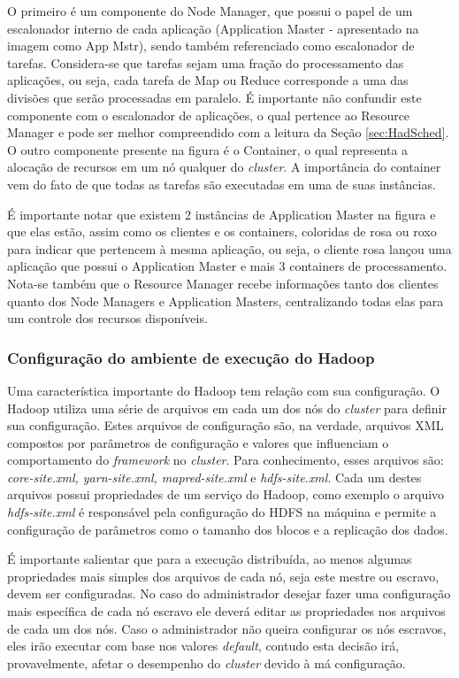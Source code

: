 O primeiro é um componente do Node Manager, que possui o papel de um escalonador interno de cada aplicação (Application Master - apresentado na imagem como App Mstr), sendo também referenciado como escalonador de tarefas. Considera-se que tarefas sejam uma fração do processamento das aplicações, ou seja, cada tarefa de Map ou Reduce corresponde a uma das divisões que serão processadas em paralelo. É importante não confundir este componente com o escalonador de aplicações, o qual pertence ao Resource Manager e pode ser melhor compreendido com a leitura da Seção \ref{sec:HadSched}. O outro componente presente na figura é o Container, o qual representa a alocação de recursos em um nó qualquer do \textit{cluster}. A importância do container vem do fato de que todas as tarefas são executadas em uma de suas instâncias.

É importante notar que existem 2 instâncias de Application Master na figura e que elas estão, assim como os clientes e os containers, coloridas de rosa ou roxo para indicar que pertencem à mesma aplicação, ou seja, o cliente rosa lançou uma aplicação que possui o Application Master e mais 3 containers de processamento. Nota-se também que o Resource Manager recebe informações tanto dos clientes quanto dos Node Managers e Application Masters, centralizando todas elas para um controle dos recursos disponíveis.

\subsubsection{Configuração do ambiente de execução do Hadoop}
Uma característica importante do Hadoop tem relação com sua configuração. O Hadoop utiliza uma série de arquivos em cada um dos nós do \textit{cluster} para definir sua configuração. Estes arquivos de configuração são, na verdade, arquivos XML compostos por parâmetros de configuração e valores que influenciam o comportamento do \textit{framework} no \textit{cluster}. Para conhecimento, esses arquivos são: \textit{core-site.xml, yarn-site.xml, mapred-site.xml} e \textit{hdfs-site.xml}. Cada um destes arquivos possui propriedades de um serviço do Hadoop, como exemplo o arquivo \textit{hdfs-site.xml} é responsável pela configuração do HDFS na máquina e permite a configuração de parâmetros como o tamanho dos blocos e a replicação dos dados.

É importante salientar que para a execução distribuída, ao menos algumas propriedades mais simples dos arquivos de cada nó, seja este mestre ou escravo, devem ser configuradas. No caso do administrador desejar fazer uma configuração mais específica de cada nó escravo ele deverá editar as propriedades nos arquivos de cada um dos nós. Caso o administrador não queira configurar os nós escravos, eles irão executar com base nos valores \textit{default}, contudo esta decisão irá, provavelmente, afetar o desempenho do \textit{cluster} devido à má configuração.

